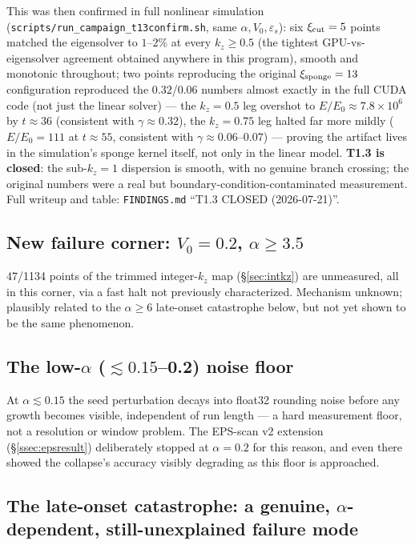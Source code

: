 \documentclass[11pt,a4paper]{article}
\numberwithin{equation}{section}
\theoremstyle{remark}
\newcommand{\eps}{\varepsilon_s}
\newcommand{\Vo}{V_0}
\newcommand{\kz}{k_z}
\begin{document}
This was then confirmed in full nonlinear simulation
(\texttt{scripts/run\_campaign\_t13confirm.sh}, same $\alpha,\Vo,\eps$):
six $\xi_{\rm cut}=5$ points matched the eigensolver to $1$--$2\%$ at every
$\kz\ge0.5$ (the tightest GPU-vs-eigensolver agreement obtained anywhere in
this program), smooth and monotonic throughout; two points reproducing the
original $\xi_{\rm sponge}=13$ configuration reproduced the $0.32$/$0.06$
numbers almost exactly in the full CUDA code (not just the linear solver)
--- the $\kz=0.5$ leg overshot to $E/E_0\approx7.8\times10^{6}$ by
$t\approx36$ (consistent with $\gamma\approx0.32$), the $\kz=0.75$ leg
halted far more mildly ($E/E_0=111$ at $t\approx55$, consistent with
$\gamma\approx0.06$--$0.07$) --- proving the artifact lives in the
simulation's sponge kernel itself, not only in the linear model.
\textbf{T1.3 is closed}: the sub-$\kz=1$ dispersion is smooth, with no
genuine branch crossing; the original numbers were a real but
boundary-condition-contaminated measurement. Full writeup and table:
\texttt{FINDINGS.md} ``T1.3 CLOSED (2026-07-21)''.

\subsection{New failure corner: $\Vo=0.2$, $\alpha\ge3.5$}

47/1134 points of the trimmed integer-$\kz$ map (\S\ref{sec:intkz}) are
unmeasured, all in this corner, via a fast halt not previously
characterized. Mechanism unknown; plausibly related to the $\alpha\ge6$
late-onset catastrophe below, but not yet shown to be the same
phenomenon.

\subsection{The low-$\alpha$ ($\lesssim0.15$--0.2) noise floor}

At $\alpha\lesssim0.15$ the seed perturbation decays into float32 rounding
noise before any growth becomes visible, independent of run length --- a
hard measurement floor, not a resolution or window problem. The
EPS-scan v2 extension (\S\ref{ssec:epsresult}) deliberately stopped at
$\alpha=0.2$ for this reason, and even there showed the collapse's
accuracy visibly degrading as this floor is approached.

\subsection{The late-onset catastrophe: a genuine, $\alpha$-dependent,
still-unexplained failure mode}
\end{document}
